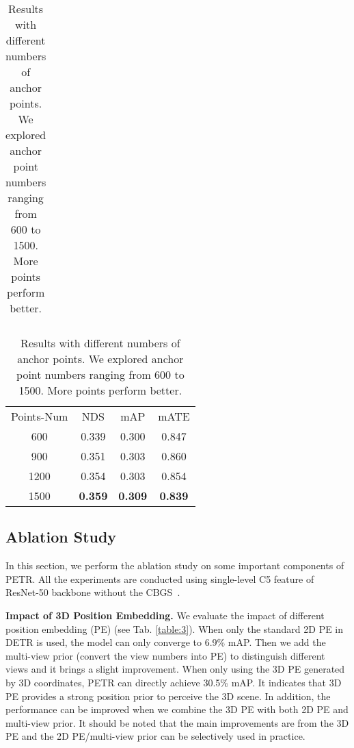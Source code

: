 \documentclass[runningheads]{llncs}
\begin{document}
\begin{table}[t!]
\begin{center}
\begin{subtable}[t]{0.45\linewidth}
\begin{tabular}{c|ccc}
        \hline
        \end{tabular}
        \caption{
``None'' means no anchor points following DETR.
        ``Fix-BEV'' and ``Fix-3D'' mean the grid anchor points in BEV space and 3D space respectively. 
        }
    \end{subtable}
    \setlength{\tabcolsep}{3.4pt}
    \begin{subtable}[t]{0.45\linewidth}
\begin{tabular}{c|ccc}
        \hline\noalign{\smallskip}
        Points-Num & NDS & mAP & mATE\\
        \noalign{\smallskip}
        \hline
        \noalign{\smallskip}
600&0.339 &0.300 &0.847\\
        900&0.351 &0.303 &0.860\\
        1200&0.354 &0.303 &0.854\\
        1500&\textbf{0.359} &\textbf{0.309} &\textbf{0.839}\\
        \hline
        \end{tabular}
        \caption{Results with different numbers of anchor points. We explored anchor point numbers ranging from 600 to 1500. More points perform better.}
    \end{subtable}
    \label{tab:array}
\end{center}
\end{table}


\subsection{Ablation Study}
In this section, we perform the ablation study on some important components of PETR. All the experiments are conducted using single-level C5 feature of ResNet-50 backbone without the CBGS~\cite{zhu2019class}.

\noindent \textbf{Impact of 3D Position Embedding.}
We evaluate the impact of different position embedding (PE) (see Tab. \ref{table:3}). When only the standard 2D PE in DETR is used, the model can only converge to 6.9\% mAP. Then we add the multi-view prior (convert the view numbers into PE) to distinguish different views and it brings a slight improvement. When only using the 3D PE generated by 3D coordinates, PETR can directly achieve 30.5\% mAP. It indicates that 3D PE provides a strong position prior to perceive the 3D scene. In addition, the performance can be improved when we combine the 3D PE with both 2D PE and multi-view prior. It should be noted that the main improvements are from the 3D PE and the 2D PE/multi-view prior can be selectively used in practice.
\end{document}
